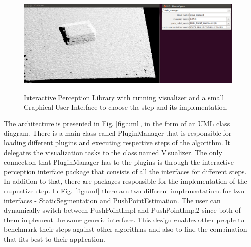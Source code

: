 \begin{figure}

{\includegraphics[width=1.1\columnwidth]{figures/ipl.png}}

\caption{Interactive Perception Library with running visualizer and a small Graphical User Interface to choose the step and its implementation.}
\label{fig:ipl}
\end{figure}

The architecture is presented in Fig. \ref{fig:uml}, in the form of an UML class diagram. There is a main class called PluginManager that is responsible for loading different plugins and executing respective steps of the algorithm. It delegates the visualization tasks to the class named Visualizer. The only connection that PluginManager has to the plugins is through the interactive perception interface package that consists of all the interfaces for different steps. In addition to that, there are packages responsible for the implementation of the respective step. In Fig. \ref{fig:uml} there are two different implementations for two interfaces - StaticSegmentation and PushPointEstimation. The user can dynamically switch between PushPointImpl and PushPointImpl2 since both of them implement the same generic interface. This design enables other people to benchmark their steps against other algorithms and also to find the combination that fits best to their application.  

